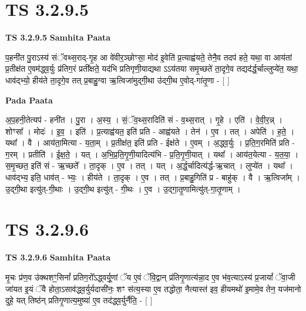 \documentclass[17pt]{extarticle}
\begin{document}
\section*{ TS 3.2.9.5 }

\textbf{TS 3.2.9.5 } \newline
\textbf{Samhita Paata} \newline

प॒हनी॑त पु॒राऽस्य॑ संॅवथ्स॒राद्-गृ॒ह आ वे॑वीर॒ञ्छोꣳसा॒ मोद॑ इ॒वेति॑ प्र॒त्याह्व॑यते॒ तेनै॒व तदप॑ हते॒ यथा॒ वा आय॑तां प्र॒तीक्ष॑त ए॒वम॑द्ध्व॒र्युः प्र॑तिग॒रं प्रती᳚क्षते॒ यद॑भि प्रतिगृणी॒याद्यथा ऽऽय॑तया समृ॒च्छते॑ ता॒दृगे॒व तद्यद॑र्द्ध॒र्चाल्लुप्ये॑त॒ यथा॒ धाव॑द्भ्यो॒ हीय॑ते ता॒दृगे॒व तत् प्र॒बाहु॒ग्वा ऋ॒त्विजा॑मुद्गी॒था उ॑द्गी॒थ ए॒वोद्-गा॑तृ॒णा - [  ] \newline

\textbf{Pada Paata} \newline

अ॒प॒हनी॒तेत्यप॑ - हनी॑त । पु॒रा । अ॒स्य॒ । सं॒ॅव॒थ्स॒रादिति॑ सं - व॒थ्स॒रात् । गृ॒हे । एति॑ । वे॒वी॒र॒न्न् । शोꣳसा᳚ । मोदः॑ । इ॒व॒ । इति॑ । प्र॒त्याह्व॑यत॒ इति॑ प्रति - आह्व॑यते । तेन॑ । ए॒व । तत् । अपेति॑ । ह॒ते॒ । यथा᳚ । वै । आय॑ता॒मित्या - य॒ता॒म् । प्र॒तीक्ष॑त॒ इति॑ प्रति - ईक्ष॑ते । ए॒वम् । अ॒द्ध्व॒र्युः । प्र॒ति॒ग॒रमिति॑ प्रति - ग॒रम् । प्रतीति॑ । ई॒क्ष॒ते॒ । यत् । अ॒भि॒प्र॒ति॒गृ॒णी॒यादित्य॑भि - प्र॒ति॒गृ॒णी॒यात् । यथा᳚ । आय॑त॒येत्या - य॒त॒या॒ । स॒मृ॒च्छत॒ इति॑ सं - ऋ॒च्छते᳚ । ता॒दृक् । ए॒व । तत् । यत् । अ॒र्द्ध॒र्चादित्य॑र्द्ध-ऋ॒चात् । लुप्ये॑त । यथा᳚ । धाव॑द्भ्य॒ इति॒ धाव॑त् - भ्यः॒ । हीय॑ते । ता॒दृक् । ए॒व । तत् । प्र॒बाहु॒गिति॑ प्र - बाहु॑क् । वै । ऋ॒त्विजा᳚म् । उ॒द्गी॒था इत्यु॑त्-गी॒थाः । उ॒द्गी॒थ इत्यु॑त् - गी॒थः । ए॒व । उ॒द्गा॒तृ॒णामित्यु॑त्-गा॒तृ॒णाम् ।  \newline




\section*{ TS 3.2.9.6 }

\textbf{TS 3.2.9.6 } \newline
\textbf{Samhita Paata} \newline

मृ॒चः प्र॑ण॒व उ॑क्थशꣳ॒॒सिनां᳚ प्रतिग॒रो᳚ऽद्ध्वर्यू॒णां ॅय ए॒वं ॅवि॒द्वान् प्र॑तिगृ॒णात्य॑न्ना॒द ए॒व भ॑व॒त्याऽस्य॑ प्र॒जायां᳚ ॅवा॒जी जा॑यत इ॒यं ॅवै होता॒ऽसाव॑द्ध्व॒र्युर्यदासी॑नः॒ शꣳ स॑त्य॒स्या ए॒व तद्धोता॒ नैत्यास्त॑ इव॒ हीयमथो॑ इ॒मामे॒व तेन॒ यज॑मानो दुहे॒ यत् तिष्ठ॑न् प्रतिगृ॒णात्य॒मुष्या॑ ए॒व तद॑द्ध्व॒र्युर्नैति॒ - [  ] \newline
\end{document}
